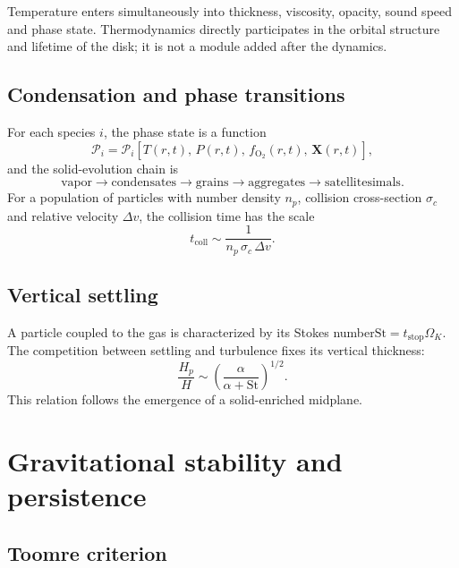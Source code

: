 \documentclass[11pt,a4paper,openany]{report}
\begin{document}
\begin{lecture}
Temperature enters simultaneously into thickness, viscosity, opacity, sound speed and phase state.
Thermodynamics directly participates in the orbital structure and lifetime of the disk; it is not a
module added after the dynamics.
\end{lecture}

\subsection{Condensation and phase transitions}

For each species $i$, the phase state is a function
\begin{equation}
\mathcal{P}_i=\mathcal{P}_i\!\left[T(r,t),\,P(r,t),\,f_{\mathrm{O_2}}(r,t),\,\mathbf{X}(r,t)\right],
\label{eq:phase}
\end{equation}
and the solid-evolution chain is
\begin{equation}
\text{vapor}\rightarrow\text{condensates}\rightarrow\text{grains}\rightarrow
\text{aggregates}\rightarrow\text{satellitesimals}.
\label{eq:chaine}
\end{equation}
For a population of particles with number density $n_p$, collision cross-section $\sigma_c$ and
relative velocity $\Delta v$, the collision time has the scale
\begin{equation}
t_{\mathrm{coll}}\sim\frac{1}{n_p\,\sigma_c\,\Delta v}.
\label{eq:tcoll}
\end{equation}

\subsection{Vertical settling}

A particle coupled to the gas is characterized by its Stokes number$\mathrm{St}=t_{\mathrm{stop}}\Omega_K$. The competition between settling and turbulence fixes its
vertical thickness:
\begin{equation}
\frac{H_p}{H}\sim\left(\frac{\alpha}{\alpha+\mathrm{St}}\right)^{1/2}.
\label{eq:Hp}
\end{equation}
This relation follows the emergence of a solid-enriched midplane.

\section{Gravitational stability and persistence}
\subsection{Toomre criterion}
\end{document}
